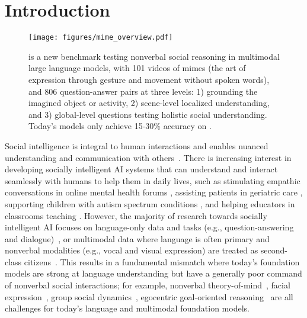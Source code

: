 
\section{Introduction}

\begin{figure}[t!]
    \centering
    \vspace{-4mm}
    \texttt{[image: figures/mime\_overview.pdf]}
    \caption{\textbf{\data} is a new benchmark testing nonverbal social reasoning in multimodal large language models, with 101 videos of mimes (the art of expression through gesture and movement without spoken words), and 806 question-answer pairs at three levels: 1) grounding the imagined object or activity, 2) scene-level localized understanding, and 3) global-level questions testing holistic social understanding. Today's models only achieve 15-30\% accuracy on \data.}
    \vspace{-4mm}
    \label{fig:overview}
\end{figure}

Social intelligence is integral to human interactions and enables nuanced understanding and communication with others~\citep{mathur-etal-2024-advancing,gweon2023socially,breazeal2003toward}. There is increasing interest in developing socially intelligent AI systems that can understand and interact seamlessly with humans to help them in daily lives, such as stimulating empathic conversations in online mental health forums \cite{sharma2023human}, assisting patients in geriatric care \cite{gonzalez2021social, fleming2003caregiver}, supporting children with autism spectrum conditions \cite{hurst2020social, scassellati2012robots}, and helping educators in classrooms teaching \cite{woo2021use}. However, the majority of research towards socially intelligent AI focuses on language-only data and tasks (e.g., question-answering and dialogue)~\citep{kim2023soda,sap2019socialiqa}, or multimodal data where language is often primary and nonverbal modalities (e.g., vocal and visual expression) are treated as second-class citizens~\citep{liang2024foundations,zadeh2018multimodal}. This results in a fundamental mismatch where today's foundation models are strong at language understanding but have a generally poor command of nonverbal social interactions; for example, nonverbal theory-of-mind~\citep{kampisNonverbalComponentsTheory2017}, facial expression~\cite{huang2023language,liang2024hemm}, group social dynamics~\citep{shum2019theory}, egocentric goal-oriented reasoning~\citep{jiaEgoTaskQAUnderstandingHuman2022} are all challenges for today's language and multimodal foundation models.

